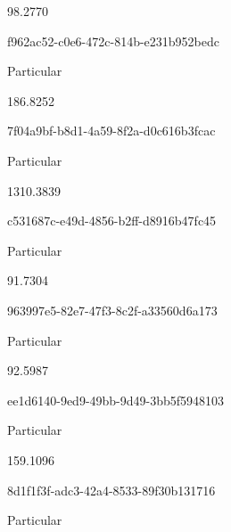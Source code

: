 \documentclass[
  11pt,
  a4paper,
  DIV=11,
  numbers=noendperiod]{scrartcl}
\begin{document}
\n      

98.2770

\n    

\n    

\n      

f962ac52-c0e6-472c-814b-e231b952bedc

\n      

Particular

\n      

186.8252

\n    

\n    

\n      

7f04a9bf-b8d1-4a59-8f2a-d0c616b3fcac

\n      

Particular

\n      

1310.3839

\n    

\n    

\n      

c531687c-e49d-4856-b2ff-d8916b47fc45

\n      

Particular

\n      

91.7304

\n    

\n    

\n      

963997e5-82e7-47f3-8c2f-a33560d6a173

\n      

Particular

\n      

92.5987

\n    

\n    

\n      

ee1d6140-9ed9-49bb-9d49-3bb5f5948103

\n      

Particular

\n      

159.1096

\n    

\n    

\n      

8d1f1f3f-adc3-42a4-8533-89f30b131716

\n      

Particular

\n      
\end{document}
